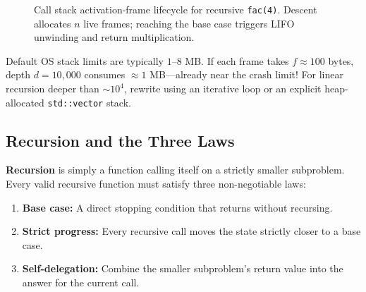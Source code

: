 \documentclass[11pt,a4paper]{article}
\theoremstyle{definition}
\begin{document}
\begin{figure}[htbp]
\caption{Call stack activation-frame lifecycle for recursive \texttt{fac(4)}. Descent allocates $n$ live frames; reaching the base case triggers LIFO unwinding and return multiplication.}
\label{fig:call-stack}
\end{figure}

\begin{watchoutbox}
Default OS stack limits are typically $1$--$8$ MB. If each frame takes $f \approx 100$ bytes, depth $d = 10{,}000$ consumes $\approx 1$ MB---already near the crash limit! For linear recursion deeper than $\sim 10^4$, rewrite using an iterative loop or an explicit heap-allocated \texttt{std::vector} stack.
\end{watchoutbox}

\subsection{Recursion and the Three Laws}

\textbf{Recursion} is simply a function calling itself on a strictly smaller subproblem. Every valid recursive function must satisfy three non-negotiable laws:
\begin{enumerate}
    \item \textbf{Base case:} A direct stopping condition that returns without recursing.
    \item \textbf{Strict progress:} Every recursive call moves the state strictly closer to a base case.
    \item \textbf{Self-delegation:} Combine the smaller subproblem's return value into the answer for the current call.
\end{enumerate}
\end{document}
